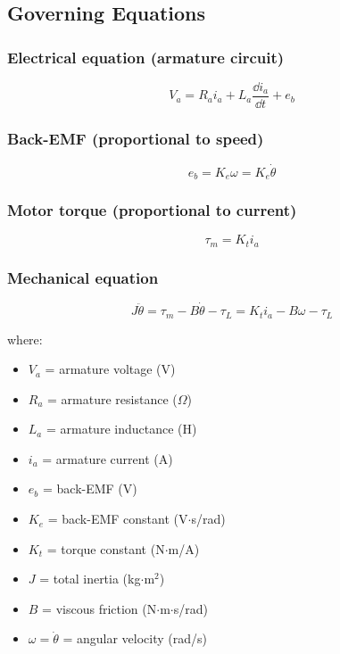 

\subsection{Governing Equations}

\subsubsection{Electrical equation (armature circuit)}
\begin{equation}
V_a = R_a i_a + L_a\frac{\dd i_a}{\dd t} + e_b
\end{equation}

\subsubsection{Back-EMF (proportional to speed)}
\begin{equation}
e_b = K_e \omega = K_e \dot{\theta}
\end{equation}

\subsubsection{Motor torque (proportional to current)}
\begin{equation}
\tau_m = K_t i_a
\end{equation}

\subsubsection{Mechanical equation}
\begin{equation}
J\ddot{\theta} = \tau_m - B\dot{\theta} - \tau_L = K_t i_a - B\omega - \tau_L
\end{equation}

where:
\begin{itemize}
    \item $V_a$ = armature voltage (V)
    \item $R_a$ = armature resistance ($\Omega$)
    \item $L_a$ = armature inductance (H)
    \item $i_a$ = armature current (A)
    \item $e_b$ = back-EMF (V)
    \item $K_e$ = back-EMF constant (V$\cdot$s/rad)
    \item $K_t$ = torque constant (N$\cdot$m/A)
    \item $J$ = total inertia (kg$\cdot$m$^2$)
    \item $B$ = viscous friction (N$\cdot$m$\cdot$s/rad)
    \item $\omega = \dot{\theta}$ = angular velocity (rad/s)
\end{itemize}

